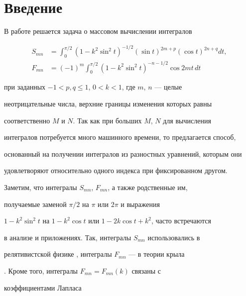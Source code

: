 \label{begin} 


 


\section*{Введение} 


 


В работе решается задача о массовом вычислении интегралов 


\begin{align*} 


S_{mn}&=\int^{\pi/2}_0(1-k^2\sin^2 t)^{-1/2}(\sin t)^{2m+p} 


(\cos t)^{2n+q}dt,\\ 


F_{mn}&=(-1)^m\int^{\pi/2}_0(1-k^2\sin^2 t)^{-n-1/2} 


\cos 2m t\,dt 


\end{align*} 


при заданных $-1<p,q\le 1$, $0<k<1$, где $m$, $n$ --- целые 


неотрицательные числа, верхние границы изменения которых равны 


соответственно $M$ и $N$. Так как при больших $M$, $N$ для вычисления 


интегралов потребуется много машинного времени, то предлагается способ, 


основанный на получении интегралов из разностных уравнений, которым они 


удовлетворяют относительно одного индекса при фиксированном другом. 


 


Заметим, что интегралы $S_{mn}$, $F_{mn}$, а также родственные им, 


получаемые заменой $\pi/2$ на $\pi$ или $2\pi$ и выражения 


$1-k^2\sin^2t$ на $1-k^2\cos t$ или $1-2k\cos t+k^2$, часто встречаются 


в анализе и приложениях. Так, интегралы $S_{mn}$ использовались в 


релятивистской физике \cite{1}, интегралы $F_{mn}$ --- в теории крыла 


\cite{2}. Кроме того, интегралы $F_{mn}=F_{mn}(k)$ связаны с 


коэффициентами Лапласа 


$$ 



